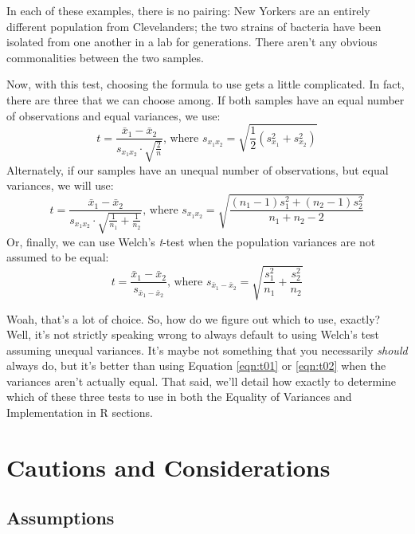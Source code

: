 In each of these examples, there is no pairing: New Yorkers are an entirely different population from Clevelanders; the two strains of bacteria have been isolated from one another in a lab for generations. There aren't any obvious commonalities between the two samples.

Now, with this test, choosing the formula to use gets a little complicated. In fact, there are three that we can choose among. If both samples have an equal number of observations and equal variances, we use:
\begin{equation}
t = \frac{\bar {x}_1 - \bar{x}_2}{s_{x_1x_2} \cdot \sqrt{\frac{2}{n}}}\text{, where }s_{x_1x_2} = \sqrt{\frac{1}{2}(s_{x_1}^2+s_{x_2}^2)}
\label{eqn:t01}
\end{equation}
Alternately, if our samples have an unequal number of observations, but equal variances, we will use:
\begin{equation}
t = \frac{\bar {x}_1 - \bar{x}_2}{s_{x_1x_2} \cdot \sqrt{\frac{1}{n_1}+\frac{1}{n_2}}}\text{, where }s_{x_1x_2} = \sqrt{\frac{(n_1-1)s_{1}^2+(n_2-1)s_{2}^2}{n_1+n_2-2}}
\label{eqn:t02}
\end{equation}
Or, finally, we can use Welch's \textit{t}-test when the population variances are not assumed to be equal:
\begin{equation}
t = {\frac{\bar{x}_1 - \bar{x}_2}{s_{\bar{x}_1 - \bar{x}_2}}}\text{, where }s_{\bar{x}_1 - \bar{x}_2} = \sqrt{\frac{s_1^2}{n_1} + \frac{s_2^2}{n_2}}
\label{eqn:t03}
\end{equation}

Woah, that's a lot of choice. So, how do we figure out which to use, exactly? Well, it's not strictly speaking wrong to always default to using Welch's test assuming unequal variances. It's maybe not something that you necessarily \textit{should} always do, but it's better than using Equation \ref{eqn:t01} or \ref{eqn:t02} when the variances aren't actually equal. That said, we'll detail how exactly to determine which of these three tests to use in both the Equality of Variances and Implementation in R sections.

\section{Cautions and Considerations}

\subsection{Assumptions}

